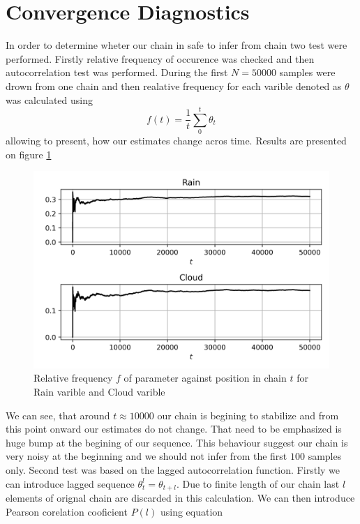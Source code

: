 \documentclass[12pt,a4paper]{article}
\begin{document}
\section{Convergence Diagnostics}
In order to determine wheter our chain in safe to infer from chain two test were performed. Firstly relative frequency of occurence was checked and then 
autocorrelation test was performed. During the first $N=50000$ samples were drown from one chain and then realative frequency for each varible denoted as $\theta$ was calculated using
\begin{equation*}
    f(t)=\frac{1}{t}\sum_0^{t}\theta_t
\end{equation*} allowing to present, how our estimates change acros time. Results are presented on figure \ref{plot_5}
\begin{figure}[H]
    \begin{center}
    \includegraphics{plot_5.png}
    \end{center}
    \caption{Relative frequency $f$ of parameter against position in chain $t$ for Rain varible and Cloud varible}\label{plot_5}
\end{figure}
We can see, that around $t\approx 10000$ our chain is begining to stabilize and from this point onward our estimates do not change. That need to be emphasized is huge 
bump at the begining of our sequence. This behaviour suggest our chain is very noisy at the beginning and we should not infer from the first $100$ samples only.
Second test was based on the lagged autocorrelation function. Firstly we can introduce lagged sequence $\theta^{l}_t=\theta_{t+l}$. Due to finite length of our chain last $l$ 
elements of orignal chain are discarded in this calculation. We can then introduce Pearson corelation cooficient $P(l)$ using equation
\end{document}
